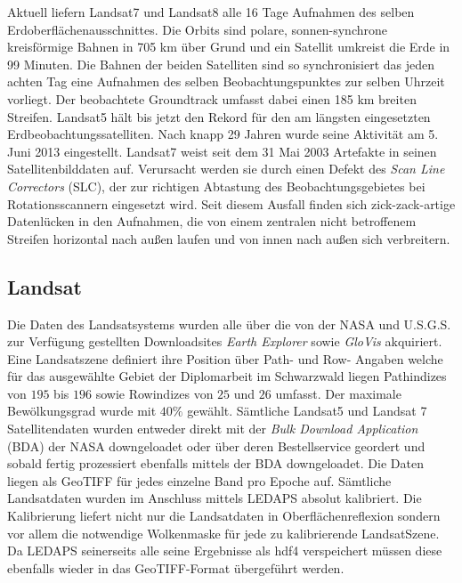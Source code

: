 \documentclass[11pt]{report}
\begin{document}
Aktuell liefern Landsat7  und Landsat8  alle 16 Tage Aufnahmen des selben Erdoberflächenausschnittes. Die Orbits sind polare, sonnen-synchrone kreisförmige Bahnen in 705 km über Grund und ein Satellit umkreist die Erde in 99 Minuten. Die Bahnen der beiden Satelliten sind so synchronisiert das jeden achten Tag eine Aufnahmen des selben Beobachtungspunktes zur selben Uhrzeit vorliegt. Der beobachtete Groundtrack umfasst dabei einen 185 km breiten Streifen.  Landsat5 hält bis jetzt den Rekord für den am längsten eingesetzten Erdbeobachtungssatelliten. Nach knapp 29 Jahren wurde seine Aktivität am 5. Juni 2013 eingestellt. Landsat7 weist seit dem 31 Mai 2003 Artefakte in seinen Satellitenbilddaten auf. Verursacht werden sie durch einen Defekt des \textit{Scan Line Correctors} (SLC), der zur richtigen Abtastung des Beobachtungsgebietes bei Rotationsscannern eingesetzt wird. Seit diesem Ausfall finden sich zick-zack-artige Datenlücken in den Aufnahmen, die von einem zentralen nicht betroffenem Streifen horizontal nach außen laufen und von innen nach außen sich verbreitern.

\subsection{Landsat}
Die Daten des Landsatsystems wurden alle über die von der NASA und U.S.G.S. zur Verfügung gestellten Downloadsites \textit{Earth Explorer} sowie \textit{GloVis} akquiriert. Eine Landsatszene definiert ihre Position über Path- und Row- Angaben welche für das ausgewählte Gebiet der Diplomarbeit im Schwarzwald liegen Pathindizes von $195$ bis $196$ sowie Rowindizes von $25$ und $26$ umfasst. Der maximale Bewölkungsgrad wurde mit $40\%$ gewählt. Sämtliche Landsat5 und Landsat 7 Satellitendaten wurden entweder direkt mit der \textit{Bulk Download Application} (BDA) der NASA downgeloadet oder über deren Bestellservice geordert und sobald fertig prozessiert ebenfalls mittels der BDA downgeloadet.
Die Daten liegen als GeoTIFF für jedes einzelne Band pro Epoche auf. Sämtliche Landsatdaten wurden im Anschluss mittels LEDAPS absolut kalibriert. Die Kalibrierung liefert nicht nur die Landsatdaten in Oberflächenreflexion sondern vor allem die notwendige Wolkenmaske für jede zu kalibrierende LandsatSzene. Da LEDAPS seinerseits alle seine Ergebnisse  als hdf4 verspeichert müssen diese ebenfalls wieder in das GeoTIFF-Format übergeführt werden. 
\end{document}
